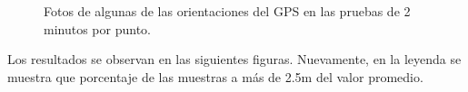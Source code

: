 \documentclass[spanish,12pt,a4paper,titlepage]{report}
\begin{document}
\begin{figure} [h!]
  \centering
  \caption{Fotos de algunas de las orientaciones del GPS en las pruebas de 2 minutos por punto.}
  \label{fig:or-2-m}
\end{figure}

Los resultados se observan en las siguientes figuras. Nuevamente, en la leyenda se muestra que porcentaje de las muestras a más de 2.5m del valor promedio.
\end{document}
